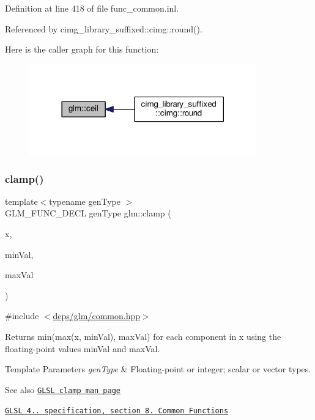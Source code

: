 Definition at line 418 of file func\+\_\+common.\+inl.



Referenced by cimg\+\_\+library\+\_\+suffixed\+::cimg\+::round().

Here is the caller graph for this function\+:
\nopagebreak
\begin{figure}[H]
\begin{center}
\leavevmode
\includegraphics[width=278pt]{d0/de3/group__core__func__common_gafb9d2a645a23aca12d4d6de0104b7657_icgraph}
\end{center}
\end{figure}
\mbox{\label{group__core__func__common_ga93bce26c7d80d30a62f5c508f8498a6c}} 
\subsubsection{\texorpdfstring{clamp()}{clamp()}\hspace{0.1cm}{\footnotesize\ttfamily [1/3]}}
{\footnotesize\ttfamily template$<$typename gen\+Type $>$ \\
G\+L\+M\+\_\+\+F\+U\+N\+C\+\_\+\+D\+E\+CL gen\+Type glm\+::clamp (\begin{DoxyParamCaption}\item[{gen\+Type}]{x,  }\item[{gen\+Type}]{min\+Val,  }\item[{gen\+Type}]{max\+Val }\end{DoxyParamCaption})}



{\ttfamily \#include $<$\hyperlink{common_8hpp}{deps/glm/common.\+hpp}$>$}

Returns min(max(x, min\+Val), max\+Val) for each component in x using the floating-\/point values min\+Val and max\+Val.


\begin{DoxyTemplParams}{Template Parameters}
{\em gen\+Type} & Floating-\/point or integer; scalar or vector types.\\
\hline
\end{DoxyTemplParams}
\begin{DoxySeeAlso}{See also}
\href{http://www.opengl.org/sdk/docs/manglsl/xhtml/clamp.xml}{\tt G\+L\+SL clamp man page} 

\href{http://www.opengl.org/registry/doc/GLSLangSpec.4.20.8.pdf}{\tt G\+L\+SL 4.. specification, section 8. Common Functions} 
\end{DoxySeeAlso}


